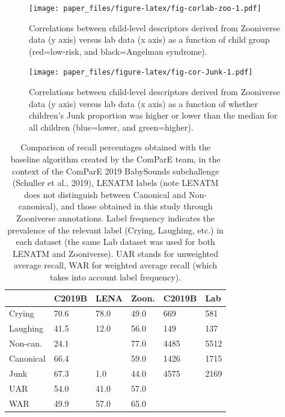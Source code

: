 \documentclass[english,,man]{apa6}
\begin{document}
\begin{figure}
\centering
\texttt{[image: paper\_files/figure-latex/fig-corlab-zoo-1.pdf]}
\caption{\label{fig:fig-corlab-zoo}Correlations between child-level descriptors derived from Zooniverse data (y axis) versus lab data (x axis) as a function of child group (red=low-risk, and black=Angelman syndrome).}
\end{figure}

\begin{figure}
\centering
\texttt{[image: paper\_files/figure-latex/fig-cor-Junk-1.pdf]}
\caption{\label{fig:fig-cor-Junk}Correlations between child-level descriptors derived from Zooniverse data (y axis) versus lab data (x axis) as a function of whether children's Junk proportion was higher or lower than the median for all children (blue=lower, and green=higher).}
\end{figure}

\begin{table}

\caption{\label{tab:tab-LENA-challenge}Comparison of recall percentages obtained with the baseline algorithm created by the ComParE team, in the context of the ComParE 2019 BabySounds subchallenge (Schuller et al., 2019), LENATM labels (note LENATM does not distinguish between Canonical and Non-canonical), and those obtained in this study through Zooniverse annotations. Label frequency indicates the prevalence of the relevant label (Crying, Laughing, etc.) in each dataset (the same Lab dataset was used for both LENATM and Zooniverse). UAR stands for unweighted average recall, WAR for weighted average recall (which takes into account label frequency).}
\centering
\begin{tabular}[t]{l|l|l|l|l|l}
\hline
 & C2019B & LENA & Zoon. & C2019B & Lab\\
\hline
Crying & 70.6 & 78.0 & 49.0 & 669 & 581\\
\cline{1-6}
Laughing & 41.5 & 12.0 & 56.0 & 149 & 137\\
\cline{1-6}
Non-can. & 24.1 &  & 77.0 & 4485 & 5512\\
\cline{1-2}
\cline{4-6}
Canonical & 66.4 & \multirow{-2}{*}{\raggedright\arraybackslash 73.0} & 59.0 & 1426 & 1715\\
\cline{1-6}
Junk & 67.3 & 1.0 & 44.0 & 4575 & 2169\\
\cline{1-6}
UAR & 54.0 & 41.0 & 57.0 &  & \\
\cline{1-4}
WAR & 49.9 & 57.0 & 65.0 & \multirow{-2}{*}{\raggedright\arraybackslash } & \multirow{-2}{*}{\raggedright\arraybackslash }\\
\hline
\end{tabular}
\end{table}
\end{document}
